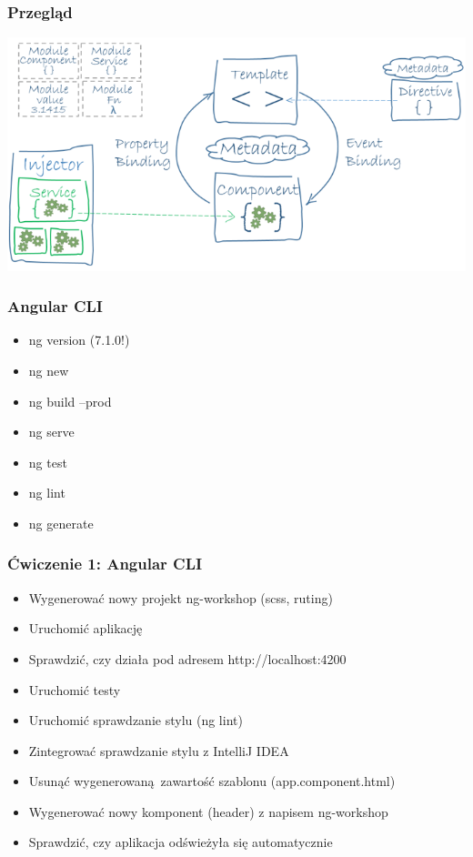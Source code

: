\documentclass{beamer}
\begin{document}
\begin{frame}
    \frametitle{Przegląd}
    \begin{center}
	\includegraphics[scale=0.4]{overview2.png}
    \end{center}
\end{frame}

\begin{frame}
    \frametitle{Angular CLI}
    \begin{itemize}
        \item ng version (7.1.0!)
        \item ng new
        \item ng build --prod
        \item ng serve
        \item ng test
	\item ng lint
        \item ng generate
    \end{itemize}
\end{frame}

\begin{frame}
    \frametitle{Ćwiczenie 1: Angular CLI}
    \begin{itemize}
        \item Wygenerować nowy projekt ng-workshop (scss, ruting)
        \item Uruchomić aplikację
        \item Sprawdzić, czy działa pod adresem http://localhost:4200
        \item Uruchomić testy
	\item Uruchomić sprawdzanie stylu (ng lint)
        \item Zintegrować sprawdzanie stylu z IntelliJ IDEA
        \item Usunąć wygenerowaną zawartość szablonu (app.component.html)
        \item Wygenerować nowy komponent (header) z napisem ng-workshop
        \item Sprawdzić, czy aplikacja odświeżyła się automatycznie
    \end{itemize}
\end{frame}
\end{document}
